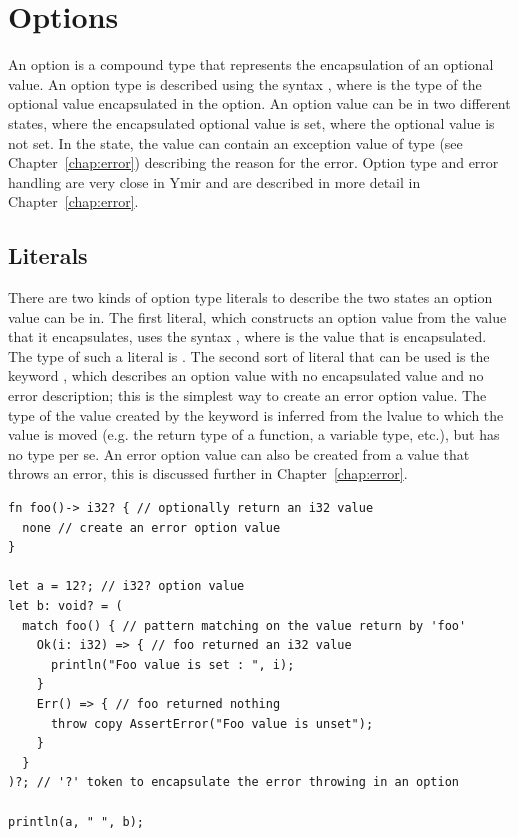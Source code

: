 \section{Options}%
\label{sec:compound:options}

An option is a compound type that represents the encapsulation of an optional
value. An option type is described using the syntax , where
 is the type of the optional value encapsulated in the option. An
option value can be in two different states,  where the encapsulated
optional value is set,  where the optional value is not set. In the
 state, the value can contain an exception value of type
 (see Chapter~\ref{chap:error}) describing the
reason for the error. Option type and error handling are very close in Ymir and
are described in more detail in Chapter~\ref{chap:error}.

\subsection{Literals}

There are two kinds of option type literals to describe the two states an option
value can be in. The first literal, which constructs an option value from the
value that it encapsulates, uses the syntax , where  is the
value that is encapsulated. The type of such a literal is .
The second sort of literal that can be used is the keyword , which
describes an option value with no encapsulated value and no error description;
this is the simplest way to create an error option value. The type of the value
created by the keyword  is inferred from the lvalue to which the
value is moved (e.g. the return type of a function, a variable type, etc.), but
has no type per se. An error option value can also be created from a value that
throws an error, this is discussed further in Chapter~\ref{chap:error}.

\begin{lstlisting}[style=coloredverbatim]
fn foo()-> i32? { // optionally return an i32 value
  none // create an error option value
}

let a = 12?; // i32? option value
let b: void? = (
  match foo() { // pattern matching on the value return by 'foo'
    Ok(i: i32) => { // foo returned an i32 value
      println("Foo value is set : ", i);
    }
    Err() => { // foo returned nothing
      throw copy AssertError("Foo value is unset");
    }
  }
)?; // '?' token to encapsulate the error throwing in an option

println(a, " ", b);
\end{lstlisting}

